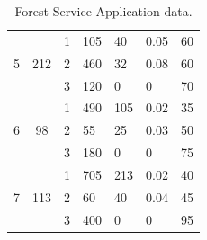\documentclass[a4paper,10 pt,titlepage,twoside]{report}
\theoremstyle{plain}
\theoremstyle{definition}
\theoremstyle{remark}
\begin{document}
{{\begin{table}[]
\begin{tabular}{cccllll}
		\multirow{3}{*}{5} & \multirow{3}{*}{212} & 1 & 105 & 40 & 0.05 & 60 \\
		&  & 2 & 460 & 32 & 0.08 & 60 \\
		&  & 3 & 120 & 0 & 0 & 70 \\ \hline
		\multirow{3}{*}{6} & \multirow{3}{*}{98} & 1 & 490 & 105 & 0.02 & 35 \\
		&  & 2 & 55 & 25 & 0.03 & 50 \\
		&  & 3 & 180 & 0 & 0 & 75 \\ \hline
		\multirow{3}{*}{7} & \multirow{3}{*}{113} & 1 & 705 & 213 & 0.02 & 40 \\
		&  & 2 & 60 & 40 & 0.04 & 45 \\
		&  & 3 & 400 & 0 & 0 & 95 \\ \hline
	\end{tabular}\caption{\label{table:timber}Forest Service Application data.}
\end{table}

}}
\end{document}
